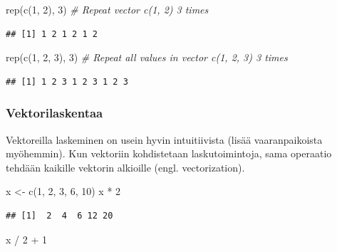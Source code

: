 \documentclass[
]{book}
\newenvironment{Shaded}{\begin{snugshade}}{\end{snugshade}}
\newcommand{\CommentTok}[1]{\textcolor[rgb]{0.56,0.35,0.01}{\textit{#1}}}
\newcommand{\DecValTok}[1]{\textcolor[rgb]{0.00,0.00,0.81}{#1}}
\newcommand{\FunctionTok}[1]{\textcolor[rgb]{0.00,0.00,0.00}{#1}}
\newcommand{\NormalTok}[1]{#1}
\newcommand{\OtherTok}[1]{\textcolor[rgb]{0.56,0.35,0.01}{#1}}
\newcommand{\SpecialCharTok}[1]{\textcolor[rgb]{0.00,0.00,0.00}{#1}}
\begin{document}
\begin{Shaded}
\begin{Highlighting}[]
\FunctionTok{rep}\NormalTok{(}\FunctionTok{c}\NormalTok{(}\DecValTok{1}\NormalTok{, }\DecValTok{2}\NormalTok{), }\DecValTok{3}\NormalTok{) }\CommentTok{\# Repeat vector c(1, 2) 3 times}
\end{Highlighting}
\end{Shaded}

\begin{verbatim}
## [1] 1 2 1 2 1 2
\end{verbatim}

\begin{Shaded}
\begin{Highlighting}[]
\FunctionTok{rep}\NormalTok{(}\FunctionTok{c}\NormalTok{(}\DecValTok{1}\NormalTok{, }\DecValTok{2}\NormalTok{, }\DecValTok{3}\NormalTok{), }\DecValTok{3}\NormalTok{) }\CommentTok{\# Repeat all values in vector c(1, 2, 3) 3 times}
\end{Highlighting}
\end{Shaded}

\begin{verbatim}
## [1] 1 2 3 1 2 3 1 2 3
\end{verbatim}

\hypertarget{vectorcalc}{%
\subsubsection{Vektorilaskentaa}\label{vectorcalc}}

Vektoreilla laskeminen on usein hyvin intuitiivista (lisää vaaranpaikoista myöhemmin). Kun vektoriin kohdistetaan laskutoimintoja, sama operaatio tehdään kaikille vektorin alkioille (engl. vectorization).

\begin{Shaded}
\begin{Highlighting}[]
\NormalTok{x }\OtherTok{\textless{}{-}} \FunctionTok{c}\NormalTok{(}\DecValTok{1}\NormalTok{, }\DecValTok{2}\NormalTok{, }\DecValTok{3}\NormalTok{, }\DecValTok{6}\NormalTok{, }\DecValTok{10}\NormalTok{)}
\NormalTok{x }\SpecialCharTok{*} \DecValTok{2}
\end{Highlighting}
\end{Shaded}

\begin{verbatim}
## [1]  2  4  6 12 20
\end{verbatim}

\begin{Shaded}
\begin{Highlighting}[]
\NormalTok{x }\SpecialCharTok{/} \DecValTok{2} \SpecialCharTok{+} \DecValTok{1}
\end{Highlighting}
\end{Shaded}
\end{document}
